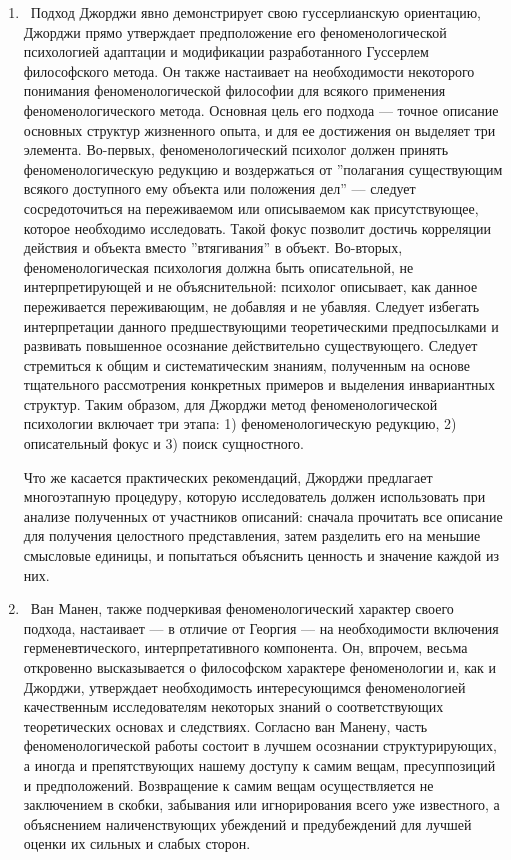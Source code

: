 \documentclass[11pt]{book}
\begin{document}
\begin{enumerate}

  \item\ Подход Джорджи явно демонстрирует свою гуссерлианскую ориентацию, Джорджи прямо утверждает предположение его феноменологической психологией адаптации и модификации разработанного Гуссерлем философского метода. Он также настаивает на необходимости некоторого понимания феноменологической философии для всякого применения феноменологического метода. Основная цель его подхода --- точное описание основных структур жизненного опыта, и для ее достижения он выделяет три элемента. Во-первых, феноменологический психолог должен принять феноменологическую редукцию и воздержаться от ''полагания существующим всякого доступного ему объекта или положения дел'' --- следует сосредоточиться на переживаемом или описываемом как присутствующее, которое необходимо исследовать. Такой фокус позволит достичь корреляции действия и объекта вместо ''втягивания'' в объект. Во-вторых, феноменологическая психология должна быть описательной, не интерпретирующей и не объяснительной: психолог описывает, как данное переживается переживающим, не добавляя и не убавляя. Следует избегать интерпретации данного предшествующими теоретическими предпосылками и развивать повышенное осознание действительно существующего. Следует стремиться к общим и систематическим знаниям, полученным на основе тщательного рассмотрения конкретных примеров и выделения инвариантных структур. Таким образом, для Джорджи метод феноменологической психологии включает три этапа: 1) феноменологическую редукцию, 2) описательный фокус и 3) поиск сущностного.

Что же касается практических рекомендаций, Джорджи предлагает многоэтапную процедуру, которую исследователь должен использовать при анализе полученных от участников описаний: сначала прочитать все описание для получения целостного представления, затем разделить его на меньшие смысловые единицы, и попытаться объяснить ценность и значение каждой из них.

  \item\ Ван Манен, также подчеркивая феноменологический характер своего подхода, настаивает --- в отличие от Георгия --- на необходимости включения герменевтического, интерпретативного компонента. Он, впрочем, весьма откровенно высказывается о философском характере феноменологии и, как и Джорджи, утверждает необходимость интересующимся феноменологией качественным исследователям некоторых знаний о соответствующих теоретических основах и следствиях. Согласно ван Манену, часть феноменологической работы состоит в лучшем осознании структурирующих, а иногда и препятствующих нашему доступу к самим вещам, пресуппозиций и предположений. Возвращение к самим вещам осуществляется не заключением в скобки, забывания или игнорирования всего уже известного, а объяснением наличенствующих убеждений и предубеждений для лучшей оценки их сильных и слабых сторон.


\end{enumerate}
\end{document}
